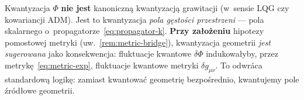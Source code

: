 \begin{remark}\label{rem:quant-vs-geom}
Kwantyzacja $\Phi$ \textbf{nie jest} kanoniczn\k{a} kwantyzacj\k{a}
grawitacji (w~sensie LQG czy kowariancji ADM). Jest to kwantyzacja
\emph{pola g\k{e}sto\'sci przestrzeni} --- pola skalarnego
o~propagatorze~\eqref{eq:propagator-k}. \textbf{Przy za\l{}o\.zeniu}
hipotezy pomostowej metryki (uw.~\ref{rem:metric-bridge}),
kwantyzacja geometrii \emph{jest sugerowana} jako konsekwencja:
fluktuacje kwantowe $\delta\Phi$
indukowa\l{}yby, przez metryk\k{e}~\eqref{eq:metric-exp}, fluktuacje
kwantowe metryki $\delta g_{\mu\nu}$. To odwr\'aca
standardow\k{a} logik\k{e}: zamiast kwantowa\'c geometri\k{e}
bezpo\'srednio, kwantujemy pole \'zr\'od\l{}owe geometrii.
\end{remark}


